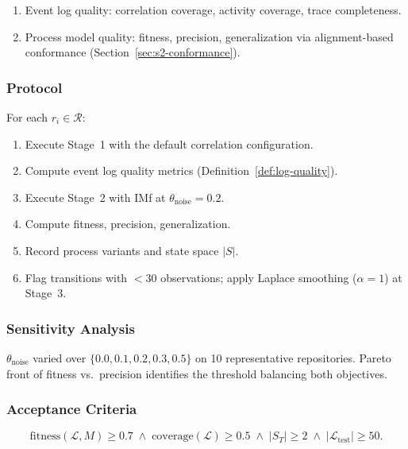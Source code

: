 \begin{enumerate}
    \item Event log quality: correlation coverage, activity coverage,
    trace completeness.
    \item Process model quality: fitness, precision, generalization via
    alignment-based conformance (Section~\ref{sec:s2-conformance}).
\end{enumerate}

\subsubsection{Protocol}

For each $r_i \in \mathcal{R}$:
\begin{enumerate}
    \item Execute Stage~1 with the default correlation configuration.
    \item Compute event log quality metrics
    (Definition~\ref{def:log-quality}).
    \item Execute Stage~2 with IMf at $\theta_{\text{noise}} = 0.2$.
    \item Compute fitness, precision, generalization.
    \item Record process variants and state space $|S|$.
    \item Flag transitions with $< 30$ observations; apply Laplace
    smoothing ($\alpha = 1$) at Stage~3.
\end{enumerate}

\subsubsection{Sensitivity Analysis}

$\theta_{\text{noise}}$ varied over $\{0.0, 0.1, 0.2, 0.3, 0.5\}$ on 10
representative repositories. Pareto front of fitness vs.\ precision
identifies the threshold balancing both objectives.

\subsubsection{Acceptance Criteria}

\begin{equation}
\label{eq:acceptance}
\text{fitness}(\mathcal{L}, M) \geq 0.7 \;\wedge\;
\text{coverage}(\mathcal{L}) \geq 0.5 \;\wedge\;
|S_T| \geq 2 \;\wedge\;
|\mathcal{L}_{\text{test}}| \geq 50.
\end{equation}

